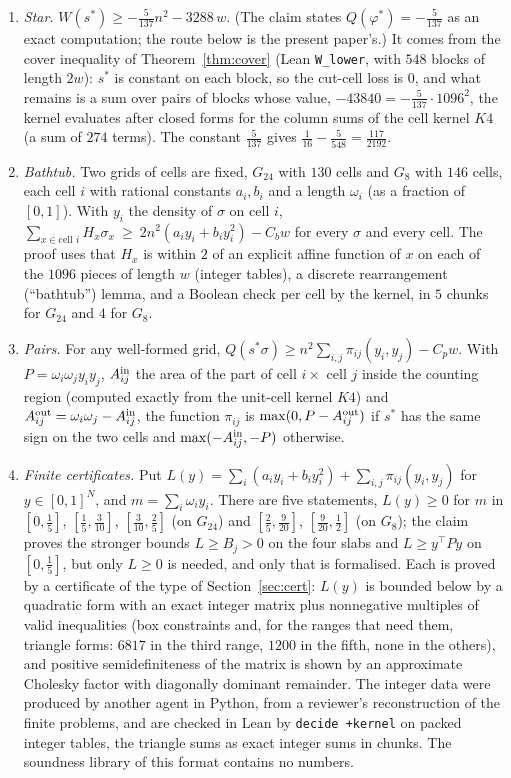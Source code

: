 \documentclass[11pt]{amsart}
\theoremstyle{remark}
\newcommand{\lean}[1]{\texttt{#1}}
\begin{document}
\begin{enumerate}
\item[(a)] \emph{Star.} $W(s^*)\ge-\frac5{137}n^2-3288\,w$. (The claim states $Q(\varphi^*)=-\frac5{137}$ as an exact computation; the route below is the present paper's.) It comes from the cover inequality of Theorem~\ref{thm:cover} (Lean \lean{W\_lower}, with $548$ blocks of length $2w$): $s^*$ is constant on each block, so the cut-cell loss is $0$, and what remains is a sum over pairs of blocks whose value, $-43840=-\frac5{137}\cdot1096^2$, the kernel evaluates after closed forms for the column sums of the cell kernel $K4$ (a sum of $274$ terms). The constant $\frac5{137}$ gives $\frac1{16}-\frac5{548}=\frac{117}{2192}$.
\item[(b)] \emph{Bathtub.} Two grids of cells are fixed, $G_{24}$ with $130$ cells and $G_8$ with $146$ cells, each cell $i$ with rational constants $a_i,b_i$ and a length $\omega_i$ (as a fraction of $[0,1]$). With $y_i$ the density of $\sigma$ on cell $i$, $\sum_{x\in\text{cell }i}H_x\sigma_x\ \ge\ 2n^2(a_iy_i+b_iy_i^2)-C_bw$ for every $\sigma$ and every cell. The proof uses that $H_x$ is within $2$ of an explicit affine function of $x$ on each of the $1096$ pieces of length $w$ (integer tables), a discrete rearrangement (``bathtub'') lemma, and a Boolean check per cell by the kernel, in $5$ chunks for $G_{24}$ and $4$ for $G_8$.
\item[(c)] \emph{Pairs.} For any well-formed grid, $Q(s^*\sigma)\ge n^2\sum_{i,j}\pi_{ij}(y_i,y_j)-C_pw$. With $P=\omega_i\omega_jy_iy_j$, $A^{\rm in}_{ij}$ the area of the part of cell $i\times$ cell $j$ inside the counting region (computed exactly from the unit-cell kernel $K4$) and $A^{\rm out}_{ij}=\omega_i\omega_j-A^{\rm in}_{ij}$, the function $\pi_{ij}$ is $\max(0,P-A^{\rm out}_{ij})$ if $s^*$ has the same sign on the two cells and $\max(-A^{\rm in}_{ij},-P)$ otherwise.
\item[(d)] \emph{Finite certificates.} Put $L(y)=\sum_i(a_iy_i+b_iy_i^2)+\sum_{i,j}\pi_{ij}(y_i,y_j)$ for $y\in[0,1]^N$, and $m=\sum_i\omega_iy_i$. There are five statements, $L(y)\ge0$ for $m$ in $[0,\frac15]$, $[\frac15,\frac3{10}]$, $[\frac3{10},\frac25]$ (on $G_{24}$) and $[\frac25,\frac9{20}]$, $[\frac9{20},\frac12]$ (on $G_8$); the claim proves the stronger bounds $L\ge B_j>0$ on the four slabs and $L\ge y^\top Py$ on $[0,\frac15]$, but only $L\ge0$ is needed, and only that is formalised. Each is proved by a certificate of the type of Section~\ref{sec:cert}: $L(y)$ is bounded below by a quadratic form with an exact integer matrix plus nonnegative multiples of valid inequalities (box constraints and, for the ranges that need them, triangle forms: $6817$ in the third range, $1200$ in the fifth, none in the others), and positive semidefiniteness of the matrix is shown by an approximate Cholesky factor with diagonally dominant remainder. The integer data were produced by another agent in Python, from a reviewer's reconstruction of the finite problems, and are checked in Lean by \lean{decide +kernel} on packed integer tables, the triangle sums as exact integer sums in chunks. The soundness library of this format contains no numbers.

\end{enumerate}
\end{document}
